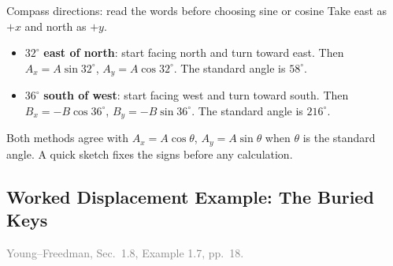 \documentclass[11pt,letterpaper]{article}
\newcommand{\degree}{^{\circ}}
\newcommand{\bookref}[2]{\textcolor{gray}{\footnotesize Young--Freedman, Sec.~#1, pp.~#2.}}
\begin{document}
\begin{examplebox}{Compass directions: read the words before choosing sine or cosine}
Take east as $+x$ and north as $+y$.
\begin{itemize}
\item $32\degree$ \textbf{east of north}: start facing north and turn toward east. Then $A_x=A\sin32\degree$, $A_y=A\cos32\degree$. The standard angle is $58\degree$.
\item $36\degree$ \textbf{south of west}: start facing west and turn toward south. Then $B_x=-B\cos36\degree$, $B_y=-B\sin36\degree$. The standard angle is $216\degree$.
\end{itemize}
Both methods agree with $A_x=A\cos\theta$, $A_y=A\sin\theta$ when $\theta$ is the standard angle. A quick sketch fixes the signs before any calculation.
\end{examplebox}

\subsection{Worked Displacement Example: The Buried Keys}
\bookref{1.8, Example 1.7}{18}
\end{document}
